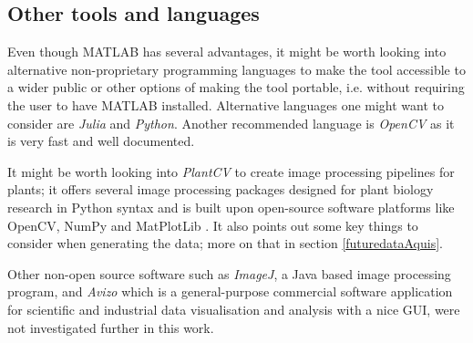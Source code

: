 %
%







\subsection{Other tools and languages}

Even though MATLAB has several advantages, it might be worth looking into alternative non-proprietary programming languages to make the tool accessible to a wider public or other options of making the tool portable, i.e. without requiring the user to have MATLAB installed.
Alternative languages one might want to consider are \textit{Julia} and \textit{Python}. Another recommended language is \textit{OpenCV} as it is very fast and well documented.

It might be worth looking into \textit{PlantCV} to create image processing pipelines for plants; it offers several image processing packages designed for plant biology research in Python syntax and is built upon open-source software platforms like OpenCV, NumPy and MatPlotLib \cite{plantCV}. It also points out some key things to consider when generating the data; more on that in section \ref{futuredataAquis}.

Other non-open source software such as \textit{ImageJ}, a Java based image processing program, and \textit{Avizo} which is a general-purpose commercial software application for scientific and industrial data visualisation and analysis with a nice GUI, were not investigated further in this work. 

